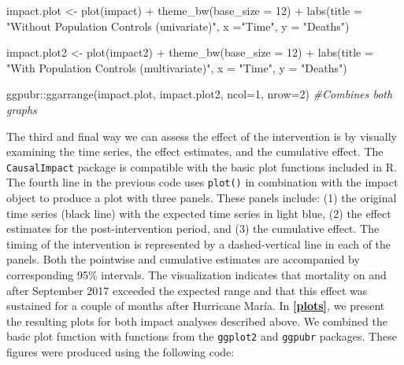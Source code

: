 \documentclass[12pt]{article}
\newenvironment{Shaded}{\begin{snugshade}}{\end{snugshade}}
\newcommand{\AttributeTok}[1]{\textcolor[rgb]{0.77,0.63,0.00}{#1}}
\newcommand{\CommentTok}[1]{\textcolor[rgb]{0.56,0.35,0.01}{\textit{#1}}}
\newcommand{\DecValTok}[1]{\textcolor[rgb]{0.00,0.00,0.81}{#1}}
\newcommand{\FunctionTok}[1]{\textcolor[rgb]{0.00,0.00,0.00}{#1}}
\newcommand{\NormalTok}[1]{#1}
\newcommand{\OtherTok}[1]{\textcolor[rgb]{0.56,0.35,0.01}{#1}}
\newcommand{\SpecialCharTok}[1]{\textcolor[rgb]{0.00,0.00,0.00}{#1}}
\newcommand{\StringTok}[1]{\textcolor[rgb]{0.31,0.60,0.02}{#1}}
\begin{document}
\begin{Shaded}
\begin{Highlighting}[numbers=left,,]
\NormalTok{impact.plot }\OtherTok{\textless{}{-}}  \FunctionTok{plot}\NormalTok{(impact) }\SpecialCharTok{+}  
  \FunctionTok{theme\_bw}\NormalTok{(}\AttributeTok{base\_size =} \DecValTok{12}\NormalTok{) }\SpecialCharTok{+}
  \FunctionTok{labs}\NormalTok{(}\AttributeTok{title =} \StringTok{"Without Population Controls (univariate)"}\NormalTok{, }
       \AttributeTok{x =}\StringTok{"Time"}\NormalTok{, }
       \AttributeTok{y =} \StringTok{"Deaths"}\NormalTok{)}

\NormalTok{impact.plot2 }\OtherTok{\textless{}{-}} \FunctionTok{plot}\NormalTok{(impact2) }\SpecialCharTok{+}  
  \FunctionTok{theme\_bw}\NormalTok{(}\AttributeTok{base\_size =} \DecValTok{12}\NormalTok{) }\SpecialCharTok{+}
  \FunctionTok{labs}\NormalTok{(}\AttributeTok{title =} \StringTok{"With Population Controls (multivariate)"}\NormalTok{, }
       \AttributeTok{x =} \StringTok{"Time"}\NormalTok{, }
       \AttributeTok{y =} \StringTok{"Deaths"}\NormalTok{)}

\NormalTok{ggpubr}\SpecialCharTok{::}\FunctionTok{ggarrange}\NormalTok{(impact.plot, }
\NormalTok{                  impact.plot2, }
                  \AttributeTok{ncol=}\DecValTok{1}\NormalTok{, }
                  \AttributeTok{nrow=}\DecValTok{2}\NormalTok{) }\CommentTok{\#Combines both graphs }
\end{Highlighting}
\end{Shaded}

The third and final way we can assess the effect of the intervention is
by visually examining the time series, the effect estimates, and the
cumulative effect. The \texttt{CausalImpact} package is compatible with
the basic plot functions included in R. The fourth line in the previous
code uses \texttt{plot()} in combination with the impact object to
produce a plot with three panels. These panels include: (1) the original
time series (black line) with the expected time series in light blue,
(2) the effect estimates for the post-intervention period, and (3) the
cumulative effect. The timing of the intervention is represented by a
dashed-vertical line in each of the panels. Both the pointwise and
cumulative estimates are accompanied by corresponding 95\% intervals.
The visualization indicates that mortality on and after September 2017
exceeded the expected range and that this effect was sustained for a
couple of months after Hurricane María. In \textbf{\autoref{plots}}, we
present the resulting plots for both impact analyses described above. We
combined the basic plot function with functions from the
\texttt{ggplot2} and \texttt{ggpubr} packages. These figures were
produced using the following code:
\end{document}
